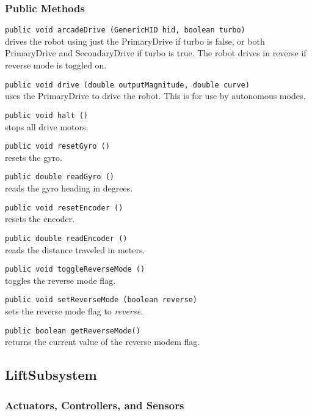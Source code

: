 \documentclass[]{article}
\begin{document}
\subsubsection{Public Methods}

\noindent
\lstinline[]|public void arcadeDrive (GenericHID hid, boolean turbo)| \\
drives the robot using just the PrimaryDrive if turbo is false, or both PrimaryDrive and SecondaryDrive if turbo is true.
The robot drives in reverse if reverse mode is toggled on.

\noindent
\lstinline[]|public void drive (double outputMagnitude, double curve)| \\
uses the PrimaryDrive to drive the robot. 
This is for use by autonomous modes.

\noindent
\lstinline[]|public void halt ()| \\
stops all drive motors.

\noindent
\lstinline[]|public void resetGyro ()| \\
resets the gyro.

\noindent
\lstinline[]|public double readGyro ()| \\
reads the gyro heading in degrees.

\noindent
\lstinline[]|public void resetEncoder ()| \\
resets the encoder.

\noindent
\lstinline[]|public double readEncoder ()| \\
reads the distance traveled in meters.

\noindent
\lstinline[]|public void toggleReverseMode ()| \\
toggles the reverse mode flag.

\noindent
\lstinline[]|public void setReverseMode (boolean reverse)| \\
sets the reverse mode flag to \textit{reverse}.

\noindent
\lstinline[]|public boolean getReverseMode()| \\
returns the current value of the reverse modem flag.


\subsection{LiftSubsystem}

\subsubsection{Actuators, Controllers, and Sensors}
\end{document}
